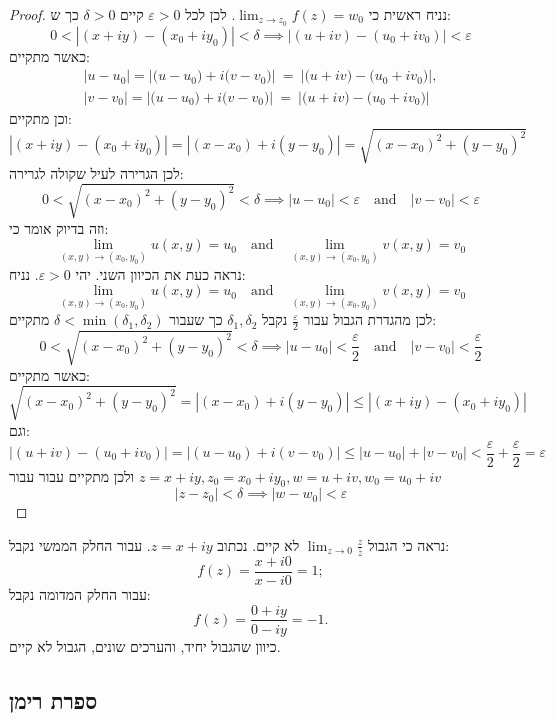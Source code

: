 \documentclass{tstextbook}
\begin{document}
\begin{proof}
נניח ראשית כי \(\lim_{ z \to z_{0} }f(z)=w_{0}\). לכן לכל \(\varepsilon>0\) קיים \(\delta>0\) כך ש:
$$0<|(x+i y)-(x_{0}+i y_{0})|<\delta\implies|(u+i v)-(u_{0}+i v_{0})|<\varepsilon$$
כאשר מתקיים:
$$\begin{array}{l}{{|u-u_{0}|=|\big(u-u_{0}\big)+i\big(v-v_{0}\big)|~=~|\big(u+i v\big)-\big(u_{0}+i v_{0}\big)|,}}\\ {{|v-v_{0}|=|\big(u-u_{0}\big)+i\big(v-v_{0}\big)|~=~|\big(u+i v\big)-\big(u_{0}+i v_{0}\big)|}}\end{array}$$
וכן מתקיים:
$$|(x+i y)-(x_{0}+i y_{0})|=|(x-x_{0})+i(y-y_{0})|={\sqrt{(x-x_{0})^{2}+(y-y_{0})^{2}}}$$
לכן הגרירה לעיל שקולה לגרירה:
$$0<\sqrt{(x-x_{0})^{2}+(y-y_{0})^{2}}<\delta\implies\left|u-u_{0}\right|<\varepsilon\quad{\mathrm{and}}\quad\left|v-v_{0}\right|<\varepsilon$$
וזה בדיוק אומר כי:
$$\operatorname*{lim}_{(x,y)\to(x_{0},y_{0})}u\left(x,y\right)=u_{0}\quad{\mathrm{and}}\quad\operatorname*{lim}_{(x,y)\to(x_{0},y_{0})}v\left(x,y\right)=v_{0}$$
נראה כעת את הכיוון השני. יהי \(\varepsilon>0\). נניח:
$$\operatorname*{lim}_{(x,y)\to(x_{0},y_{0})}u\left(x,y\right)=u_{0}\quad{\mathrm{and}}\quad\operatorname*{lim}_{(x,y)\to(x_{0},y_{0})}v\left(x,y\right)=v_{0}$$
לכן מהגדרת הגבול עבור \(\frac{\varepsilon}{2}\) נקבל \(\delta_{1},\delta_{2}\) כך שעבור \(\delta<\min\left( \delta_{1},\delta_{2} \right)\) מתקיים: 
$$0<\sqrt{(x-x_{0})^{2}+(y-y_{0})^{2}}<\delta \implies|u-u_{0}|<\frac{\varepsilon}{2}\quad{\mathrm{and}}\quad|v-v_{0}|<\frac{\varepsilon}{2}$$
כאשר מתקיים:
$${\sqrt{(x-x_{0})^{2}+(y-y_{0})^{2}}}=|(x-x_{0})+i(y-y_{0})|\leq|(x+i y)-(x_{0}+i y_{0})|$$
וגם:
$$|(u+i v)-(u_{0}+i v_{0})|=|(u-u_{0})+i(v-v_{0})|\leq|u-u_{0}|+|v-v_{0}|<\frac{\varepsilon}{2}+\frac{\varepsilon}{2}=\varepsilon$$
ולכן מתקיים עבור עבור \(z=x+iy,z_{0}=x_{0}+iy_{0},w=u+iv,w_{0}=u_{0}+iv\)$$|z-z_{0}|<\delta\implies |w-w_{0}|<\varepsilon$$

\end{proof}
\begin{example}
נראה כי הגבול \(\operatorname*{lim}_{z\to0}{\frac{z}{\overline{{z}}}}\) לא קיים. נכתוב \(z=x+iy\). עבור החלק הממשי נקבל:
$$f(z)={\frac{x+i0}{x-i0}}=1;$$
עבור החלק המדומה נקבל:
$$f(z)={\frac{0+i y}{0-i y}}=-1.$$
כיוון שהגבול יחיד, והערכים שונים, הגבול לא קיים.

\end{example}
\subsection{ספרת רימן}
\end{document}
